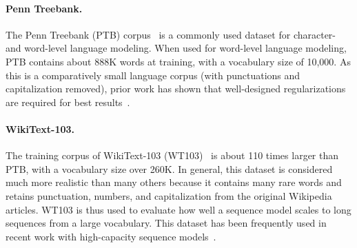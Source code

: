 \documentclass{article}
\begin{document}
\paragraph{Penn Treebank.} The Penn Treebank (PTB) corpus~\citep{Marcus93buildinga} is a commonly used dataset for character- and word-level language modeling. When used for word-level language modeling, PTB contains about 888K words at training, with a vocabulary size of 10,000. As this is a comparatively small language corpus (with punctuations and capitalization removed), prior work has shown that well-designed regularizations are required for best results~\citep{merityRegOpt,yang2018breaking}.

\paragraph{WikiText-103.} The training corpus of WikiText-103 (WT103)~\citep{merity2016pointer} is about 110 times larger than PTB, with a vocabulary size over 260K. In general, this dataset is considered much more realistic than many others because it contains many rare words and retains punctuation, numbers, and capitalization from the original Wikipedia articles. WT103 is thus used to evaluate how well a sequence model scales to long sequences from a large vocabulary. This dataset has been frequently used in recent work with high-capacity sequence models~\citep{bradbury2016quasi,bai2018trellis,dai2018transformer,baevski2019adaptive}.
\end{document}
